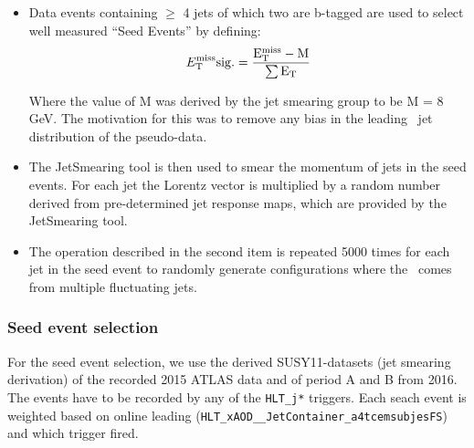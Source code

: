 \begin{itemize}
\item Data events containing $\geq$ 4 jets of which two are b-tagged are
  used to select well measured ``Seed Events'' by defining:
  $$E_{\mathrm{T}}^{\mathrm{miss}}\rm{sig.}=\frac{ E_{\mathrm{T}}^{\mathrm{miss}}-M } {\sum E_\mathrm{T} } $$

 Where the value of M was derived by the jet smearing group to be M = 8 GeV. The motivation for this was to remove any
bias in the leading \pT\ jet distribution of the pseudo-data. 

\item The JetSmearing tool is then used to smear the momentum of jets
  in the seed events. For each jet the Lorentz vector is multiplied by
  a random number derived from pre-determined jet response maps, which
  are provided by the JetSmearing tool.
  
\item The operation described in the second item is repeated 5000 times for each jet in the seed event to
randomly generate configurations where the \met\ comes from multiple fluctuating jets.

\end{itemize}

 \subsubsection{Seed event selection}

 For the seed event selection, we use the derived SUSY11-datasets (jet smearing derivation)
 of the recorded 2015 ATLAS data and of period A and B from 2016. The events have to be recorded by any of the \verb|HLT_j*| triggers. 
 Each seach event is weighted based on online leading \pt (\verb|HLT_xAOD__JetContainer_a4tcemsubjesFS|) and which trigger fired.\\
 
